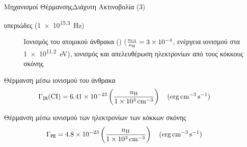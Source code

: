 \documentclass{beamer}
\begin{document}
\begin{frame}{Μηχανισμοί Θέρμανσης}{Διάχυτη Ακτινοβολία (3)}
	\begin{description}
		\item[υπεριώδες (\SI{1e15.3}{Hz})]{Ιονισμός του ατομικού άνθρακα () ($\frac{n_{\ce{CI}}}{n_{\ce{H}}} =\num{3e-4}$, ενέργεια ιονισμού στα \SI{1e11.2}{eV}), ιονισμός και απελευθέρωση ηλεκτρονίων από τους κόκκους σκόνης}
		\end{description}
		\begin{block}{Θέρμανση μέσω ιονισμού του άνθρακα}
			  \begin{equation}
			\Gamma _\mathtt{IR} (\ce{CI}) = \num{6.41e-23} \left( \frac{n_{\ce{H}}}{\SI{1e3}{cm^{-3}}} \right) \qq{(\si{erg.cm^{-3}.s^{-1}})} 
			\end{equation}
		\end{block}	
			\begin{block}{Θέρμανση μέσω ιονισμού των ηλεκτρονίων των κόκκων σκόνης}
\begin{equation}
\Gamma _\mathtt{PE} = \num{4.8e-23} \left( \frac{n_{\ce{H}}}{\SI{1e3}{cm^{-3}}} \right) \qq{(\si{erg.cm^{-3}.s^{-1}})} 
\end{equation}
	\end{block}	
\end{frame}

%	
\end{document}
